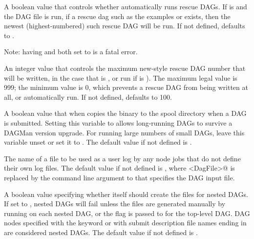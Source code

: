 \begin{description}
\label{param:DAGManAutoRescue}
\item[\Macro{DAGMAN\_AUTO\_RESCUE}]
  A boolean value that controls whether  automatically
  runs rescue DAGs.  If  is 
  and the DAG file  is run,
  if a rescue dag such as the examples  or
   exists, 
  then the newest (highest-numbered) such rescue DAG will be run.
  If not defined,  defaults to .

  Note: having  and
   both set to  is a fatal error.

\label{param:DAGManMaxRescueNum}
\item[\Macro{DAGMAN\_MAX\_RESCUE\_NUM}]
  An integer value that controls the maximum new-style rescue DAG
  number that will be written, 
  in the case that  is ,
  or run if  is ).
  The maximum legal value is 999; the minimum value is 0,
  which prevents a rescue DAG from being written at all,
  or automatically run.
  If not defined,  defaults to 100.

\label{param:DAGManCopyToSpool}
\item[\Macro{DAGMAN\_COPY\_TO\_SPOOL}]
  A boolean value that when  copies the  binary
  to the spool directory when a DAG is submitted.
  Setting this variable to  allows
  long-running DAGs to survive a DAGMan version upgrade.
  For running large numbers of small DAGs, leave this
  variable unset or set it to .
  The default value if not defined is .

\label{param:DAGManDefaultNodeLog}
\item[\Macro{DAGMAN\_DEFAULT\_NODE\_LOG}]
  The name of a file to be used as a user log by any node jobs that
  do not define their own log files.
  The default value if not defined is ,
  where \verb@<DagFile>@ is replaced by the command line argument
  to  that specifies the DAG input file.

\label{param:DAGManGenerateSubDagSubmits}
\item[\Macro{DAGMAN\_GENERATE\_SUBDAG\_SUBMITS}]
  A boolean value specifying whether  itself should
  create the  files for nested DAGs.  
  If set to , nested DAGs will fail unless
  the  files are generated manually by running
    on each nested DAG, or the
   flag is passed to  for the
  top-level DAG.
  DAG nodes specified with the
   keyword or with submit description file names ending
  in  are considered nested DAGs.
  The default value if not defined is .


\end{description}
